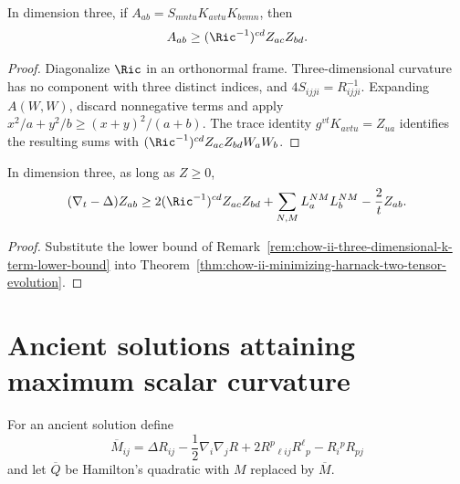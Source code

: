 \begin{remark}
\label{rem:chow-ii-three-dimensional-k-term-lower-bound}
In dimension three, if
\(A_{ab}=S_{mntu}K_{avtu}K_{bvmn}\), then
\[
A_{ab}\ge(\Ric^{-1})^{cd}Z_{ac}Z_{bd}.
\]
\end{remark}
\begin{proof}
\sketch Diagonalize \(\Ric\) in an orthonormal frame.  Three-dimensional curvature
has no component with three distinct indices, and
\(4S_{ijji}=R_{ijji}^{-1}\).  Expanding \(A(W,W)\), discard nonnegative
terms and apply
\(x^2/a+y^2/b\ge(x+y)^2/(a+b)\).  The trace identity
\(g^{vt}K_{avtu}=Z_{ua}\) identifies the resulting sums with
\((\Ric^{-1})^{cd}Z_{ac}Z_{bd}W_aW_b\).
\end{proof}

\begin{corollary}
\label{cor:chow-ii-three-dimensional-z-quadratic-evolution-bound}
In dimension three, as long as \(Z\ge0\),
\[
(\nabla_t-\Delta)Z_{ab}\ge
2(\Ric^{-1})^{cd}Z_{ac}Z_{bd}
+\sum_{N,M}L_a^{NM}L_b^{NM}-\frac2tZ_{ab}.
\]
\end{corollary}
\begin{proof}
\sketch Substitute the lower bound of
Remark~\ref{rem:chow-ii-three-dimensional-k-term-lower-bound} into
Theorem~\ref{thm:chow-ii-minimizing-harnack-two-tensor-evolution}.
\end{proof}

\section{Ancient solutions attaining maximum scalar curvature}

For an ancient solution define
\[
\overline M_{ij}=\Delta R_{ij}-\frac12\nabla_i\nabla_jR
+2R^p{}_{\ell ij}R^\ell{}_p-R_i{}^pR_{pj}
\]
and let \(\overline Q\) be Hamilton's quadratic with \(M\) replaced by
\(\overline M\).

